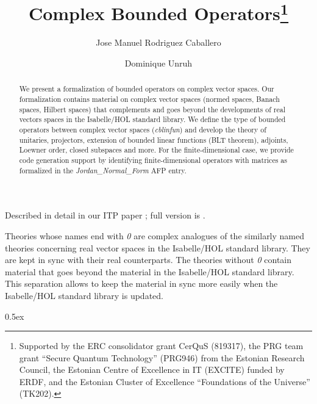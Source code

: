 \documentclass[11pt,a4paper]{article}
\begin{document}
\title{Complex Bounded Operators\thanks{Supported by the ERC consolidator grant CerQuS (819317), the PRG team grant “Secure Quantum Technology” (PRG946) from the Estonian Research Council, the Estonian Centre of Excellence in IT (EXCITE) funded by ERDF, and the Estonian Cluster of Excellence ``Foundations of the Universe'' (TK202).}}
\author[1]{Jose Manuel Rodriguez Caballero}
\author[2]{Dominique Unruh}

\maketitle

\begin{abstract}
  We present a formalization of bounded operators on complex vector spaces.
  Our formalization contains material on complex vector spaces (normed spaces, Banach spaces, Hilbert spaces)
  that complements and goes beyond the developments of real vectors spaces in the Isabelle/HOL standard library.
  We define the type of bounded operators between complex vector spaces (\textit{cblinfun}) and develop the theory of
  unitaries, projectors, extension of bounded linear functions (BLT theorem), adjoints, Loewner order, closed subspaces and more.
  For the finite-dimensional case, we provide code generation support by identifying finite-dimensional operators with matrices
  as formalized in the \textit{Jordan\_Normal\_Form} AFP entry.
\end{abstract}

Described in detail in our ITP paper \cite{bounded-operators-itp}; full version is \cite{bounded-operators-arxiv}.

\tableofcontents

Theories whose names end with \textit{0} are complex analogues of the similarly named theories concerning real vector spaces in the Isabelle/HOL standard library.
They are kept in sync with their real counterparts. The theories without \textit{0} contain material that goes beyond the material in the Isabelle/HOL standard library.
This separation allows to keep the material in sync more easily when the Isabelle/HOL standard library is updated.

\parindent 0pt\parskip 0.5ex





\end{document}
